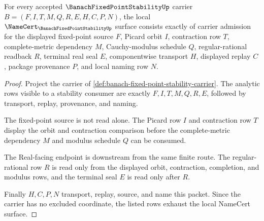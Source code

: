\begin{theorem}
\label{thm:banach-fixed-point-stability-namecert-obligations}
For every accepted $\BanachFixedPointStabilityUp$ carrier $B=(F,I,T,M,Q,R,E,H,C,P,N)$, the local $\NameCert_{\BanachFixedPointStabilityUp}$ surface consists exactly of carrier admission for the displayed fixed-point source $F$, Picard orbit $I$, contraction row $T$, complete-metric dependency $M$, Cauchy-modulus schedule $Q$, regular-rational readback $R$, terminal real seal $E$, componentwise transport $H$, displayed replay $C$, package provenance $P$, and local naming row $N$.
\end{theorem}
\begin{proof}
Project the carrier of \autoref{def:banach-fixed-point-stability-carrier}. The analytic rows visible to a stability consumer are exactly $F,I,T,M,Q,R,E$, followed by transport, replay, provenance, and naming.

The fixed-point source is not read alone. The Picard row $I$ and contraction row $T$ display the orbit and contraction comparison before the complete-metric dependency $M$ and modulus schedule $Q$ can be consumed.

The Real-facing endpoint is downstream from the same finite route. The regular-rational row $R$ is read only from the displayed orbit, contraction, completion, and modulus rows, and the terminal seal $E$ is read only after $R$.

Finally $H,C,P,N$ transport, replay, source, and name this packet. Since the carrier has no excluded coordinate, the listed rows exhaust the local NameCert surface.
\end{proof}


